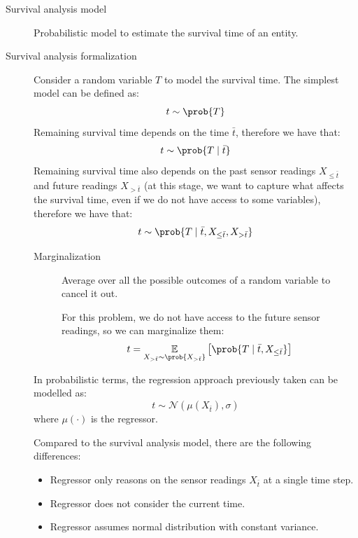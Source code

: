 \begin{description}
    \item[Survival analysis model] 
        Probabilistic model to estimate the survival time of an entity.

    \item[Survival analysis formalization]
        Consider a random variable $T$ to model the survival time. The simplest model can be defined as:
        \[ t \sim \prob{T} \]
        Remaining survival time depends on the time $\bar{t}$, therefore we have that:
        \[ t \sim \prob{T \mid \bar{t}} \]
        Remaining survival time also depends on the past sensor readings $X_{\leq \bar{t}}$ and future readings $X_{> \bar{t}}$ (at this stage, we want to capture what affects the survival time, even if we do not have access to some variables), therefore we have that:
        \[ t \sim \prob{T \mid \bar{t}, X_{\leq \bar{t}}, X_{> \bar{t}}} \]

        \begin{description}
            \item[Marginalization] 
                Average over all the possible outcomes of a random variable to cancel it out.

                For this problem, we do not have access to the future sensor readings, so we can marginalize them:
                \[ t = \underset{X_{> \bar{t}} \sim \prob{X_{> \bar{t}}}}{\mathbb{E}} \left[ \prob{T \mid \bar{t}, X_{\leq \bar{t}}} \right] \]
        \end{description}

        \begin{remark}
            In probabilistic terms, the regression approach previously taken can be modelled as:
            \[ t \sim \mathcal{N}(\mu(X_{\bar{t}}), \sigma) \]
            where $\mu(\cdot)$ is the regressor.

            Compared to the survival analysis model, there are the following differences:
            \begin{itemize}
                \item Regressor only reasons on the sensor readings $X_{\bar{t}}$ at a single time step. 
                \item Regressor does not consider the current time.
                \item Regressor assumes normal distribution with constant variance.
            \end{itemize}
        \end{remark}


\end{description}
